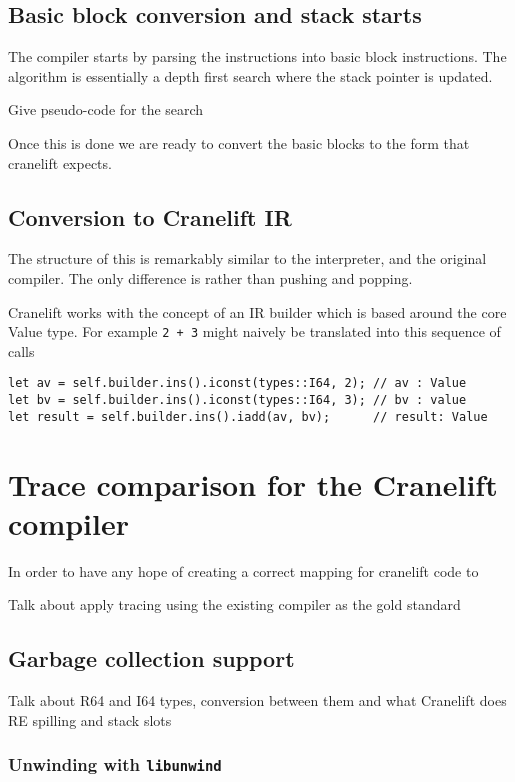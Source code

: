 \subsection{Basic block conversion and stack starts}

The compiler starts by parsing the instructions into basic block instructions. The algorithm is
essentially a depth first search where the stack pointer is updated.

Give pseudo-code for the search

Once this is done we are ready to convert the basic blocks to the form that cranelift expects.

\subsection{Conversion to Cranelift IR}

The structure of this is remarkably similar to the interpreter, and the original compiler. The only
difference is rather than pushing and popping.

Cranelift works with the concept of an IR builder which is based around the core Value type. For
example \texttt{2 + 3} might naively be translated into this sequence of calls

\begin{verbatim}
let av = self.builder.ins().iconst(types::I64, 2); // av : Value
let bv = self.builder.ins().iconst(types::I64, 3); // bv : value
let result = self.builder.ins().iadd(av, bv);      // result: Value
\end{verbatim}

\section{Trace comparison for the Cranelift compiler}

In order to have any hope of creating a correct mapping for cranelift code to

Talk about apply tracing using the existing compiler as the gold standard

\subsection{Garbage collection support}

Talk about R64 and I64 types, conversion between them and what Cranelift does RE spilling and stack
slots

\subsubsection{Unwinding with \texttt{libunwind}}

